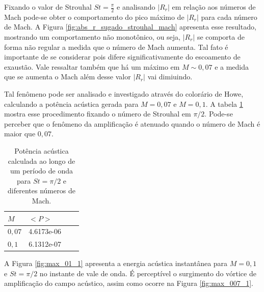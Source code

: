 \newpage
\begin{figure}[ht!]
\centering
  
\end{figure}

Fixando o valor de Strouhal $St = \frac{\pi}{2}$ e analisando $|R_{r}|$ em relação aos números de Mach pode-se obter o comportamento do pico máximo de $|R_{r}|$ para cada número de Mach. A Figura \ref{fig:abs_r_sugado_strouhal_mach} apresenta esse resultado, mostrando um comportamento não monotônico, ou seja, $|R_{r}|$ se comporta de forma não regular a medida que o número de Mach aumenta. Tal fato é importante de se considerar pois difere significativamente do escoamento de exaustão. Vale ressaltar também que há um máximo em $M \sim 0,07$ e a medida que se aumenta o Mach além desse valor $|R_{r}|$ vai dimiuindo.

Tal fenômeno pode ser analisado e investigado através do colorário de Howe, calculando a potência acústica gerada para $M = 0,07$ e $M = 0,1$. A tabela \ref{table:potencia_mach} mostra esse procedimento fixando o número de Strouhal em $\pi/2$. Pode-se perceber que o fenômeno da amplificação é atenuado quando o número de Mach é maior que $0,07$.    

\begin{table}[ht!]
\centering
\caption{Potência acústica calculada ao longo de um período de onda para $St = \pi/2$ e diferentes números de Mach.}
\label{table:potencia_mach}
    \begin{tabular}{|l|l|l|l|}
        \hline
        $M$ & $<P>$ \\ \hline
        $0,07$ & 4.6173e-06  \\ \hline  
        $0,1$ & 6.1312e-07 \\ \hline
    \end{tabular}
\end{table}

\newpage
A Figura \ref{fig:max_01_1} apresenta a energia acústica instantânea para $M = 0,1$ e $St = \pi/2$ no instante de vale de onda. É perceptível o surgimento do vórtice de amplificação do campo acústico, assim como ocorre na Figura \ref{fig:max_007_1}.

